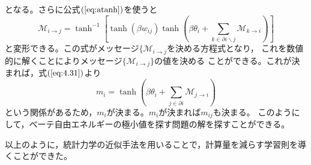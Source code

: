 となる。さらに公式$(\ref{eq:atanh})$を使うと
\begin{equation}
\mathcal{M}_{i\rightarrow j}=\tanh^{-1}\left[
\tanh(\beta w_{ij})\tanh\left(\beta\theta_{i}+
\sum_{k\in\partial i\backslash j}\mathcal{M}_{k\rightarrow i}\right)
\right]\label{eq:4.40}
\end{equation}
と変形できる。この式がメッセージ$\{\mathcal{M}_{i\rightarrow j}$を決める方程式となり，
これを数値的に解くことによりメッセージ$\{\mathcal{M}_{i\rightarrow j}\}$の値を決める
ことができる。これが決まれば，式$(\ref{eq:4.31})$より
\begin{equation}
m_{i}=\tanh\left(\beta\theta_{i}+\sum_{j\in\partial
i}\mathcal{M}_{j\rightarrow i}\right)\label{eq:4.41}
\end{equation}
という関係があるため，$m_{i}$が決まる。$m_{i}$が決まれば$m_{ij}$も決まる。
このようにして，ベーテ自由エネルギーの極小値を探す問題の解を探すことができる。

以上のように，統計力学の近似手法を用いることで，計算量を減らす学習則を導くことができた。